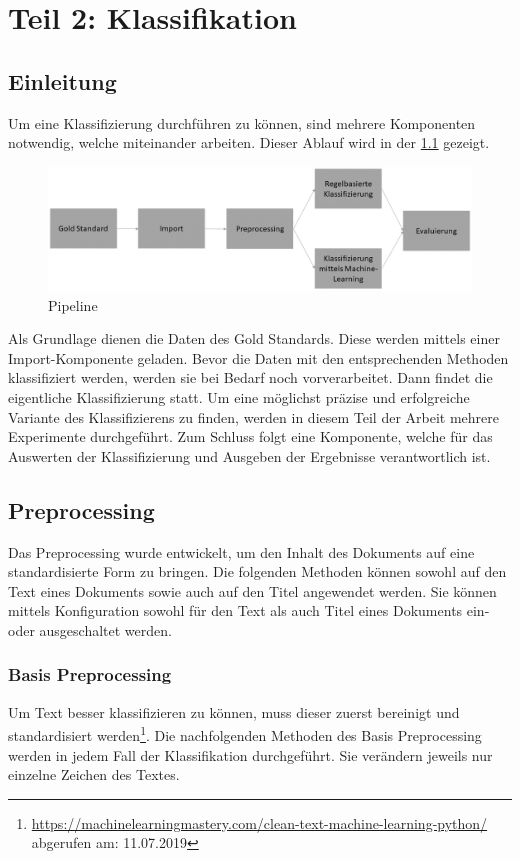 \chapter{Teil 2: Klassifikation}
\section{Einleitung}\label{sec:classification}
Um eine Klassifizierung durchführen zu können, sind mehrere Komponenten notwendig, welche miteinander arbeiten. 
Dieser Ablauf wird in der \cref{fig:ablauf_klassifizierung} gezeigt.
\begin{figure}[H]	
	\includegraphics[width=1\columnwidth,keepaspectratio]{img/Ablauf_Klassifizierung.png}
	\caption{Pipeline}
	\label{fig:ablauf_klassifizierung}
\end{figure}
Als Grundlage dienen die Daten des Gold Standards.
Diese werden mittels einer Import-Komponente geladen.
Bevor die Daten mit den entsprechenden Methoden klassifiziert werden, werden sie bei Bedarf noch vorverarbeitet.
Dann findet die eigentliche Klassifizierung statt.
Um eine möglichst präzise und erfolgreiche Variante des Klassifizierens zu finden, werden in diesem Teil der Arbeit mehrere Experimente durchgeführt.
Zum Schluss folgt eine Komponente, welche für das Auswerten der Klassifizierung und Ausgeben der Ergebnisse verantwortlich ist.
\section{Preprocessing}
Das Preprocessing wurde entwickelt, um den Inhalt des Dokuments auf eine standardisierte Form zu bringen.
Die folgenden Methoden können sowohl auf den Text eines Dokuments sowie auch auf den Titel angewendet werden.
Sie können mittels Konfiguration sowohl für den Text als auch Titel eines Dokuments ein- oder ausgeschaltet werden.
\subsection{Basis Preprocessing}
Um Text besser klassifizieren zu können, muss dieser zuerst bereinigt und standardisiert werden\footnote{\url{https://machinelearningmastery.com/clean-text-machine-learning-python/} abgerufen am: 11.07.2019}.
Die nachfolgenden Methoden des Basis Preprocessing werden in jedem Fall der Klassifikation durchgeführt.
Sie verändern jeweils nur einzelne Zeichen des Textes.
